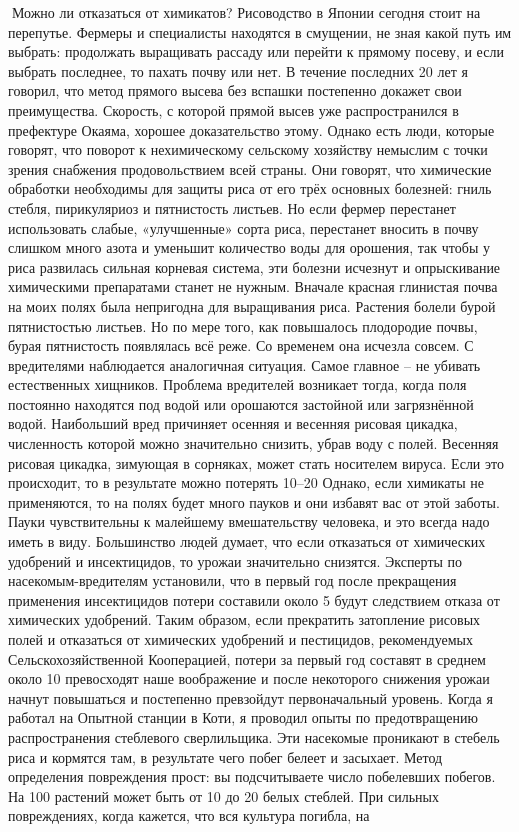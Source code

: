 \documentclass[a4paper]{book}
\begin{document}
Можно ли отказаться от химикатов?
Рисоводство в Японии сегодня стоит на перепутье. Фермеры и специалисты находятся в
смущении, не зная какой путь им выбрать: продолжать выращивать рассаду или перейти к
прямому посеву, и если выбрать последнее, то пахать почву или нет. В течение последних 20
лет я говорил, что метод прямого высева без вспашки постепенно докажет свои
преимущества. Скорость, с которой прямой высев уже распространился в префектуре
Окаяма, хорошее доказательство этому.
Однако есть люди, которые говорят, что поворот к нехимическому сельскому хозяйству
немыслим с точки зрения снабжения продовольствием всей страны. Они говорят, что
химические обработки необходимы для защиты риса от его трёх основных болезней: гниль
стебля, пирикуляриоз и пятнистость листьев. Но если фермер перестанет использовать
слабые, «улучшенные» сорта риса, перестанет вносить в почву слишком много азота и
уменьшит количество воды для орошения, так чтобы у риса развилась сильная корневая
система, эти болезни исчезнут и опрыскивание химическими препаратами станет не
нужным.
Вначале красная глинистая почва на моих полях была непригодна для выращивания
риса. Растения болели бурой пятнистостью листьев. Но по мере того, как повышалось
плодородие почвы, бурая пятнистость появлялась всё реже. Со временем она исчезла совсем.
С вредителями наблюдается аналогичная ситуация. Самое главное – не убивать
естественных хищников. Проблема вредителей возникает тогда, когда поля постоянно
находятся под водой или орошаются застойной или загрязнённой водой. Наибольший вред
причиняет осенняя и весенняя рисовая цикадка, численность которой можно значительно
снизить, убрав воду с полей.
Весенняя рисовая цикадка, зимующая в сорняках, может стать носителем вируса. Если
это происходит, то в результате можно потерять 10–20 %
Однако, если химикаты не применяются, то на полях будет много пауков и они избавят вас от
этой заботы. Пауки чувствительны к малейшему вмешательству человека, и это всегда надо
иметь в виду.
Большинство людей думает, что если отказаться от химических удобрений и
инсектицидов, то урожаи значительно снизятся. Эксперты по насекомым-вредителям
установили, что в первый год после прекращения применения инсектицидов потери
составили около 5 %
будут следствием отказа от химических удобрений.
Таким образом, если прекратить затопление рисовых полей и отказаться от химических
удобрений и пестицидов, рекомендуемых Сельскохозяйственной Кооперацией, потери за
первый год составят в среднем около 10 %
превосходят наше воображение и после некоторого снижения урожаи начнут повышаться и
постепенно превзойдут первоначальный уровень.
Когда я работал на Опытной станции в Коти, я проводил опыты по предотвращению
распространения стеблевого сверлильщика. Эти насекомые проникают в стебель риса и
кормятся там, в результате чего побег белеет и засыхает. Метод определения повреждения
прост: вы подсчитываете число побелевших побегов. На 100 растений может быть от 10 до
20 белых стеблей. При сильных повреждениях, когда кажется, что вся культура погибла, на
\end{document}
